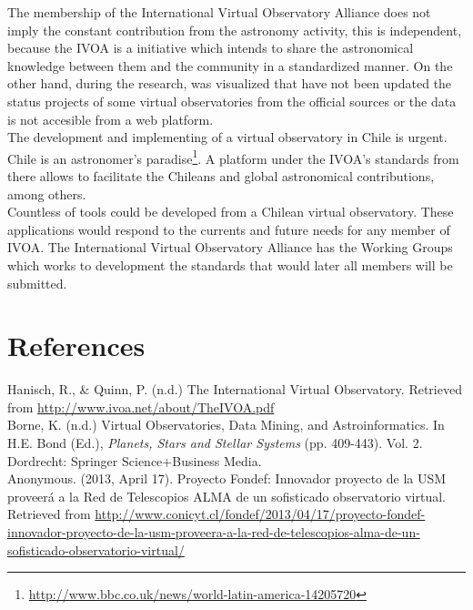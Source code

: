 \documentclass[11pt]{article}
\begin{document}
        The membership of the International Virtual Observatory Alliance does
not imply the constant contribution from the astronomy activity, this is
independent, because the IVOA is a initiative which intends to share the
astronomical knowledge between them and the community in a standardized manner.
On the other hand, during the research, was visualized that have not been
updated the status projects of some virtual observatories from the official
sources or the data is not accesible from a web platform.\\

        The development and implementing of a virtual observatory in Chile is
urgent. Chile is an astronomer's
paradise\footnote{\url{http://www.bbc.co.uk/news/world-latin-america-14205720}}.
A platform under the IVOA's standards from there allows to facilitate the
Chileans and global astronomical contributions, among others.\\

        Countless of tools could be developed from a Chilean virtual
observatory. These applications would respond to the currents and future needs
for any member of IVOA. The International Virtual Observatory Alliance has the
Working Groups which works to development the standards that would later all
members will be submitted.\\

\newpage
    
    \section{References}
        Hanisch, R., \& Quinn, P. (n.d.) The International Virtual Observatory.
Retrieved from \url{http://www.ivoa.net/about/TheIVOA.pdf}\\

        Borne, K. (n.d.) Virtual Observatories, Data Mining, and
Astroinformatics. In H.E. Bond (Ed.), \textit{Planets, Stars and Stellar
Systems} (pp. 409-443). Vol. 2. Dordrecht: Springer Science$ + $Business
Media.\\

        Anonymous. (2013, April 17). Proyecto Fondef: Innovador proyecto de la
USM proveer\'{a} a la Red de Telescopios ALMA de un sofisticado observatorio
virtual. Retrieved from
\url{http://www.conicyt.cl/fondef/2013/04/17/proyecto-fondef-innovador-proyecto-de-la-usm-proveera-a-la-red-de-telescopios-alma-de-un-sofisticado-observatorio-virtual/}\\
\end{document}

